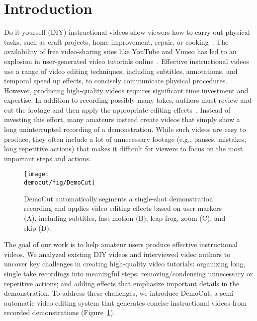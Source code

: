 
\section{Introduction}

Do it yourself (DIY) instructional videos show viewers how to carry
out physical tasks, such as craft projects, home improvement, repair,
or cooking~\cite{Torrey:2007he}. The availability of free
video-sharing sites like YouTube and Vimeo has led to an explosion in
user-generated video tutorials
online~\cite{Lafreniere:2012tl}. Effective instructional videos use a
range of video editing techniques, including subtitles, annotations, and
temporal speed up effects, to concisely communicate physical
procedures. However, producing high-quality videos requires
significant time investment and expertise. In addition to recording
possibly many takes, authors must review and cut the footage and then
apply the appropriate editing effects~\cite{Muller:2009tw}.
Instead of investing this effort, many amateurs instead create videos that simply show a long
uninterrupted recording of a demonstration.
%
While such videos are easy to produce, they often include a
lot of unnecessary footage (e.g., pauses, mistakes, long repetitive
actions) that makes it difficult for viewers to focus on the most
important steps and actions.
%

\begin{figure}[t]
  \centering
	\texttt{[image: \\democut/fig/DemoCut]}
  \caption{DemoCut automatically segments a single-shot demonstration recording and applies video editing effects based on user markers (A), including subtitles, fast motion (B), leap frog, zoom (C), and skip (D).}
  \label{fig:teaser}
\end{figure}

The goal of our work is to help amateur users produce effective instructional videos.
%
We analyzed existing DIY videos and interviewed video authors to uncover key challenges in creating high-quality
video tutorials: organizing long, single take recordings into
meaningful steps; removing/condensing unnecessary or repetitive
actions; and adding effects that emphasize important details in the
demonstration.
%
To address these challenges, we introduce DemoCut, a semi-automatic
video editing system that generates concise instructional videos from
recorded demonstrations (Figure~\ref{fig:teaser}).


